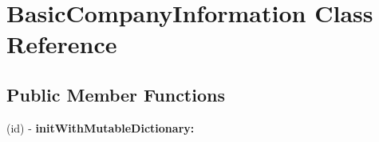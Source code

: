 \hypertarget{interface_basic_company_information}{
\section{\-Basic\-Company\-Information \-Class \-Reference}
\label{interface_basic_company_information}
}
\subsection*{\-Public \-Member \-Functions}
\begin{DoxyCompactItemize}
\item 
\hypertarget{interface_basic_company_information_adc38b76ef2520c90d8b1c3f66451bb8a}{
(id) -\/ {\bfseries init\-With\-Mutable\-Dictionary\-:}}
\label{interface_basic_company_information_adc38b76ef2520c90d8b1c3f66451bb8a}

\end{DoxyCompactItemize}
